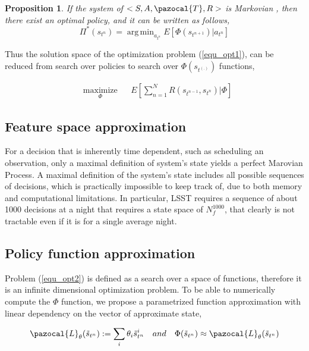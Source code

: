 \documentclass[12pt]{article}
\newtheorem{prop}{Proposition}
\theoremstyle{definition}
\DeclareMathOperator*{\argmin}{arg\,min}
\begin{document}
\begin{prop}
If the system of  $<S, A, \pazocal{T}, R>$  is Markovian , then there exist an optimal policy, and it can be written as follows,
\begin{equation}\label{equ_opt_pol}
\Pi^*(s_{t^n}) = \argmin_{a_{t^n}} E[\Phi(s_{t^{n+1}}) | a_{t^n}]
\end{equation}
\end{prop}

Thus the solution space of the optimization problem (\ref{equ_opt1}), can be reduced from search over policies to search over $\Phi(s_{t^{(.)}})$ functions,

\begin{equation}\label{equ_opt2}
\begin{aligned}
& \underset{\Phi}{\text{maximize}}
& & E[\sum_{n=1}^{N} R(s_{t^{n-1}}, s_{t^n}) | \Phi] 
\end{aligned}
\end{equation}

\subsection{Feature space approximation}
For a decision that is inherently time dependent, such as scheduling an observation, only a maximal definition of system's state yields a perfect Marovian Process. A maximal definition of the system's state includes all possible sequences of decisions, which is practically impossible to keep track of, due to both memory and computational limitations. In particular, LSST requires a sequence of about 1000 decisions at a night that requires a state space of $N_{f}^1000$, that clearly is not tractable even if it is for a single average night.

\subsection{Policy function approximation}
Problem (\ref{equ_opt2}) is defined as a search over a space of functions, therefore it is an infinite dimensional optimization problem. To be able to numerically compute the $\Phi$ function, we propose a parametrized function approximation with linear dependency on the vector of approximate state,

\begin{equation*}
 \pazocal{L}_{\theta}(\tilde{s}_{t^n}) := \sum_i \theta_i \tilde{s}^i_{t^n} ~~~and~~~\Phi(\tilde{s}_{t^n}) \approx  \pazocal{L}_{\theta}(\tilde{s}_{t^n})
\end{equation*}
\end{document}
